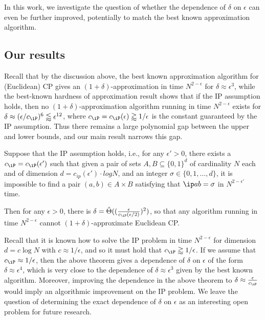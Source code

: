 \documentclass[11pt]{article}
\begin{document}
In this work, we investigate the question of whether the dependence of $\delta$ on $\epsilon$ can even be further improved, potentially to match the best known approximation algorithm.

\subsection{Our results}

Recall that by the discussion above, the best known approximation algorithm for (Euclidean) CP gives an $(1+\delta)$-approximation in time $N^{2-\epsilon}$ for $\delta \approx \epsilon^3$, while the best-known hardness of approximation result shows that if the IP assumption holds, then no $(1+\delta)$-approximation algorithm running in time $N^{2-\epsilon}$ exists for
$\delta \approx  (\epsilon/c_{\iP})^6 \lessapprox \epsilon^{12}$, where $c_{\iP} = c_{\iP}(\epsilon) \gtrapprox 1/\epsilon$  is the constant guaranteed by the IP assumption.
Thus there remains a large polynomial gap between the upper and lower bounds, and our main result narrows this gap.

\begin{thm}\label{thm:main}
Suppose that the IP assumption holds, i.e.,  for any $\epsilon'>0$, there exists a $c_{\iP}= c_{\iP}(\epsilon')$ such that given a pair of sets $A,B\subseteq\{0,1\}^{d}$ of cardinality $N$ each and of dimension $d = c_{ip}(\epsilon') \cdot logN$, and an integer $\sigma \in \{0,1,\ldots,d\}$,  it is impossible to find a pair $(a,b)\in A\times B$
satisfying that $\ip a b=\sigma$ in $N^{2-\epsilon'}$ time. 

Then for any $\epsilon>0$, there is  $\delta = \tilde \Theta(  ( \frac \epsilon {c_{\iP}(\epsilon/2)})^2)$,  so that any algorithm running in time 
$N^{2-\epsilon}$ cannot 
$(1+\delta)$-approximate Euclidean CP.
\end{thm}


Recall that it is known how to solve the IP problem in time $N^{2-\epsilon}$ for dimension $d = c \log N$ with 
$c\approx 1/\epsilon$, and so it must hold that $c_{\iP}  \gtrapprox 1/\epsilon$. If we assume that $c_{\iP} \approx 1/\epsilon$, then the above theorem gives a dependence of $\delta$ on $\epsilon$ of the form $\delta \approx \epsilon^4 $, which is very close to the dependence of $\delta \approx \epsilon^3$ given by the best known algorithm. Moreover, improving the dependence in the above theorem to $\delta \approx \frac \epsilon {c_{\iP}}$ would imply an algorithmic improvement on the IP problem. We leave the question of determining the exact dependence of $\delta$ on $\epsilon$ as an interesting open problem for future research.
\end{document}
